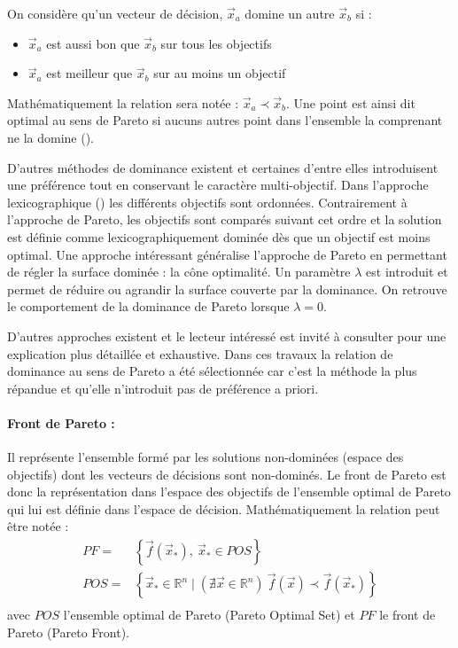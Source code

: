 \noindent On considère qu’un vecteur de décision, $\vec{x}_{a}$ domine un autre $\vec{x}_{b}$ si :
\begin{itemize}
  \item $\vec{x}_{a}$ est aussi bon que $\vec{x}_{b}$ sur tous les objectifs
  \item $\vec{x}_{a}$ est meilleur que $\vec{x}_{b}$ sur au moins un objectif
\end{itemize}
Mathématiquement la relation sera notée : $\vec{x}_{a} \prec \vec{x}_{b}$.
Une point est ainsi dit optimal au sens de Pareto si aucuns autres point dans
l’ensemble la comprenant ne la domine ().

D’autres méthodes de dominance existent et certaines d’entre elles introduisent
une préférence tout en conservant le caractère multi-objectif.
Dans l’approche lexicographique () les différents objectifs
sont ordonnées. Contrairement à l’approche de Pareto, les objectifs sont comparés
suivant cet ordre et la solution est définie comme lexicographiquement dominée dès
que un objectif est moins optimal.
Une approche intéressant généralise l’approche de Pareto en permettant de régler
la surface dominée : la cône optimalité. Un paramètre $\lambda$ est introduit et
permet de réduire ou agrandir la surface couverte par la dominance. On retrouve le
comportement de la dominance de Pareto lorsque $\lambda = 0$.

D’autres approches existent et le lecteur intéressé est invité à consulter \cite{Collette2002}
pour une explication plus détaillée et exhaustive. Dans ces travaux la relation de
dominance au sens de Pareto a été sélectionnée car c’est la méthode la plus répandue
et qu’elle n’introduit pas de préférence a priori.

\paragraph{Front de Pareto :} %
\label{par:front_de_pareto}
Il représente l’ensemble formé par les solutions non-dominées (espace des objectifs)
dont les vecteurs de décisions sont non-dominés.
Le front de Pareto est donc la représentation dans l’espace des objectifs
de l’ensemble optimal de Pareto qui lui est définie dans l’espace de décision.
Mathématiquement la relation peut être notée :
\begin{equation}
  \begin{aligned}
    PF   =& \left\{ \vec{f}(\vec{x}_{*}), \  \vec{x}_{*} \in POS \right\} \\
    POS  =& \left\{ \vec{x}_{*} \in \mathbb{R}^{n} \mid (\nexists \vec{x} \in \mathbb{R}^{n}) \  \vec{f}(\vec{x}) \prec \vec{f}(\vec{x}_{*}) \right\} \\
  \end{aligned}
\end{equation}
avec $POS$ l’ensemble optimal de Pareto (Pareto Optimal Set) et $PF$ le front de Pareto
(Pareto Front).

